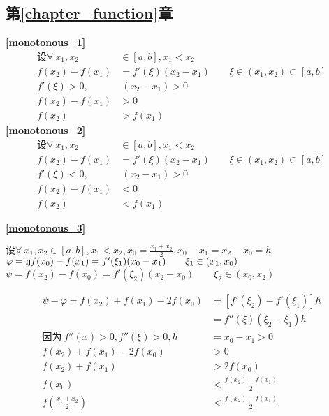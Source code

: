 \subsection{\centering 第\ref{chapter_function}章}
\textbf{\large \ref{monotonous_1}}
\begin{align*}
        \mbox{设}\forall \ x_1,x_2&\in\left[a,b\right],x_1<x_2\\
        f(x_2)-f(x_1)&=f'(\xi)(x_2-x_1)\qquad \xi\in(x_1,x_2)\subset[a,b]\\
        f'(\xi)>0 ,&\ (x_2-x_1)>0\\
        f(x_2)-f(x_1)&>0\\
        f(x_2)&>f(x_1)
\end{align*}
\textbf{\large \ref{monotonous_2}}
\begin{align*}
        \mbox{设}\forall\ x_1,x_2&\in\left[a,b\right],x_1<x_2\\
        f(x_2)-f(x_1)&=f'(\xi)(x_2-x_1)\qquad \xi\in(x_1,x_2)\subset[a,b]\\
        f'(\xi)<0 ,&\ (x_2-x_1)>0\\
        f(x_2)-f(x_1)&<0\\
        f(x_2)&<f(x_1)
\end{align*}

\textbf{\large \ref{monotonous_3}}
\begin{center}
    $\mbox{设}\forall\  x_1,x_2\in\left[a,b\right],x_1<x_2,x_0=\frac{x_1+x_2}{2},x_0-x_1=x_2-x_0=h$\\
        $\varphi= \ding{173}f(x_0)-f(x_1)=f'(\xi_1)(x_0-x_1)\qquad \xi_1\in(x_1,x_0)$\\
        $\psi =f(x_2)-f(x_0)=f'(\xi_2)(x_2-x_0)\qquad \xi_2\in(x_0,x_2)$
\end{center}
\begin{align*}
        \psi-\varphi=f(x_2)+f(x_1)-2f(x_0)&=\left[f'(\xi_2)-f'(\xi_1)\right]h\\
         &=f''(\xi)(\xi_2-\xi_1)h\\
         \mbox{因为}\ f''(x)>0,f''(\xi)>0,h&=x_0-x_1>0\\
         f(x_2)+f(x_1)-2f(x_0)&>0\\
        f(x_2)+f(x_1)&>2f(x_0)\\
        f(x_0)&<\frac{f(x_2)+f(x_1)}{2}\\
        f(\frac{x_1+x_2}{2})&<\frac{f(x_2)+f(x_1)}{2}
\end{align*}

